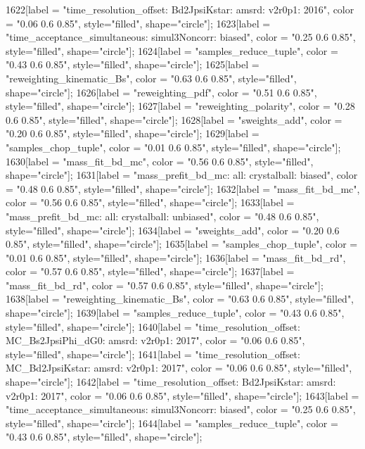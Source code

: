 {	1622[label = "time_resolution_offset\nmode: Bd2JpsiKstar\ntimeres: amsrd\nversion: v2r0p1\nyear: 2016", color = "0.06 0.6 0.85", style="filled", shape="circle"];
	1623[label = "time_acceptance_simultaneous\ntimeacc: simul3Noncorr\ntrigger: biased", color = "0.25 0.6 0.85", style="filled", shape="circle"];
	1624[label = "samples_reduce_tuple", color = "0.43 0.6 0.85", style="filled", shape="circle"];
	1625[label = "reweighting_kinematic_Bs", color = "0.63 0.6 0.85", style="filled", shape="circle"];
	1626[label = "reweighting_pdf", color = "0.51 0.6 0.85", style="filled", shape="circle"];
	1627[label = "reweighting_polarity", color = "0.28 0.6 0.85", style="filled", shape="circle"];
	1628[label = "sweights_add", color = "0.20 0.6 0.85", style="filled", shape="circle"];
	1629[label = "samples_chop_tuple", color = "0.01 0.6 0.85", style="filled", shape="circle"];
	1630[label = "mass_fit_bd_mc", color = "0.56 0.6 0.85", style="filled", shape="circle"];
	1631[label = "mass_prefit_bd_mc\nmassbin: all\nmassmodel: crystalball\ntrigger: biased", color = "0.48 0.6 0.85", style="filled", shape="circle"];
	1632[label = "mass_fit_bd_mc", color = "0.56 0.6 0.85", style="filled", shape="circle"];
	1633[label = "mass_prefit_bd_mc\nmassbin: all\nmassmodel: crystalball\ntrigger: unbiased", color = "0.48 0.6 0.85", style="filled", shape="circle"];
	1634[label = "sweights_add", color = "0.20 0.6 0.85", style="filled", shape="circle"];
	1635[label = "samples_chop_tuple", color = "0.01 0.6 0.85", style="filled", shape="circle"];
	1636[label = "mass_fit_bd_rd", color = "0.57 0.6 0.85", style="filled", shape="circle"];
	1637[label = "mass_fit_bd_rd", color = "0.57 0.6 0.85", style="filled", shape="circle"];
	1638[label = "reweighting_kinematic_Bs", color = "0.63 0.6 0.85", style="filled", shape="circle"];
	1639[label = "samples_reduce_tuple", color = "0.43 0.6 0.85", style="filled", shape="circle"];
	1640[label = "time_resolution_offset\nmode: MC_Bs2JpsiPhi_dG0\ntimeres: amsrd\nversion: v2r0p1\nyear: 2017", color = "0.06 0.6 0.85", style="filled", shape="circle"];
	1641[label = "time_resolution_offset\nmode: MC_Bd2JpsiKstar\ntimeres: amsrd\nversion: v2r0p1\nyear: 2017", color = "0.06 0.6 0.85", style="filled", shape="circle"];
	1642[label = "time_resolution_offset\nmode: Bd2JpsiKstar\ntimeres: amsrd\nversion: v2r0p1\nyear: 2017", color = "0.06 0.6 0.85", style="filled", shape="circle"];
	1643[label = "time_acceptance_simultaneous\ntimeacc: simul3Noncorr\ntrigger: biased", color = "0.25 0.6 0.85", style="filled", shape="circle"];
	1644[label = "samples_reduce_tuple", color = "0.43 0.6 0.85", style="filled", shape="circle"];
}
